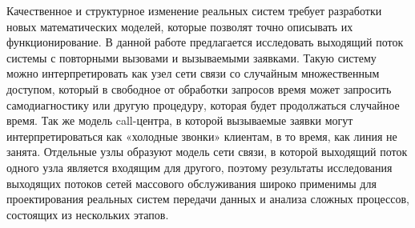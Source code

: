 Качественное и структурное изменение реальных систем требует разработки новых математических моделей, которые позволят точно описывать их функционирование. В данной работе предлагается исследовать выходящий поток системы с повторными вызовами и вызываемыми заявками.
Такую систему можно интерпретировать как узел сети связи со случайным множественным доступом, который в свободное от обработки запросов время может запросить самодиагностику или другую процедуру, которая будет продолжаться случайное время. Так же модель call-центра, в которой вызываемые заявки могут интерпретироваться как «холодные звонки» клиентам, в то время, как линия не занята.
Отдельные узлы образуют модель сети связи, в которой выходящий поток одного узла является входящим для другого, поэтому результаты исследования выходящих потоков сетей массового обслуживания широко применимы для проектирования реальных систем передачи данных и анализа сложных процессов, состоящих из нескольких этапов.


 \clearpage